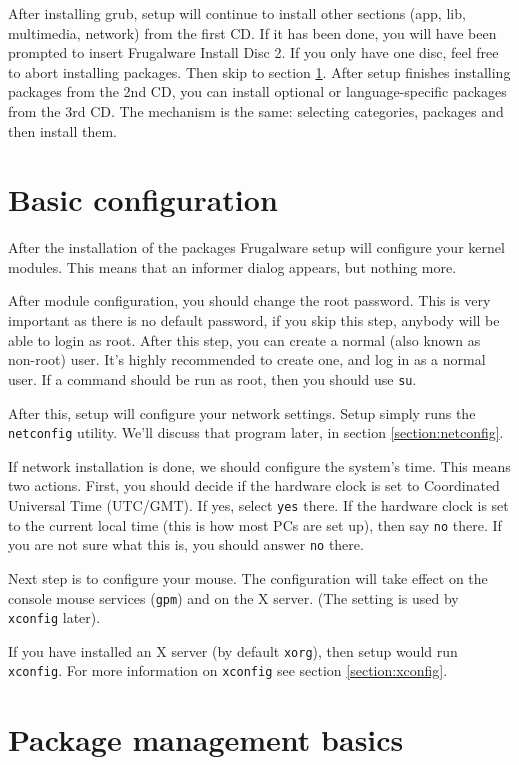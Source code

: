 After installing grub, setup will continue to install other sections (app, lib, multimedia, network) from the first CD. If it has been done, you will have been prompted to insert Frugalware Install Disc 2. If you only have one disc, feel free to abort installing packages. Then skip to section \ref{section:baseconfig}. After setup finishes installing packages from the 2nd CD, you can install optional or language-specific packages from the 3rd CD. The mechanism is the same: selecting categories, packages and then install them.

\section{Basic configuration}
\label{section:baseconfig}

After the installation of the packages Frugalware setup will configure your kernel modules. This means that an informer dialog appears, but nothing more.

After module configuration, you should change the root password. This is very important as there is no default password, if you skip this step, anybody will be able to login as root. After this step, you can create a normal (also known as non-root) user. It's highly recommended to create one, and log in as a normal user. If a command should be run as root, then you should use {\tt su}.

After this, setup will configure your network settings. Setup simply runs the {\tt netconfig} utility. We'll discuss that program later, in section \ref{section:netconfig}.

If network installation is done, we should configure the system's time. This means two actions. First, you should decide if the hardware clock is set to Coordinated Universal Time (UTC/GMT). If yes, select {\tt yes} there. If the hardware clock is set to the current local time (this is how most PCs are set up), then say {\tt no} there. If you are not sure what this is, you should answer {\tt no} there.

Next step is to configure your mouse. The configuration will take effect on the console mouse services ({\tt gpm}) and on the X server. (The setting is used by {\tt xconfig} later). 

If you have installed an X server (by default {\tt xorg}), then setup would run {\tt xconfig}. For more information on {\tt xconfig} see section \ref{section:xconfig}.

\section{Package management basics}

